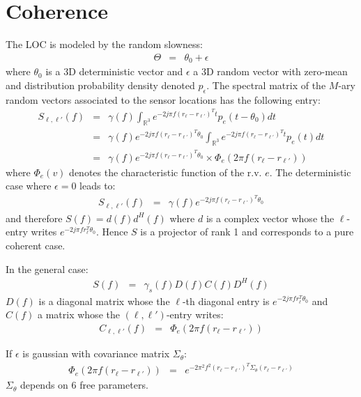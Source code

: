 \documentclass[a4paper, 12pt]{report}
\begin{document}
\chapter{Coherence}
The LOC is modeled by the random slowness:
\begin{eqnarray*}
\Theta &=& \theta_0+\epsilon
\end{eqnarray*}
where $\theta_0$ is a 3D deterministic vector and $\epsilon$ a 3D random vector with zero-mean and distribution probability density denoted $p_{\epsilon}$. The spectral matrix of the $M$-ary random vectors associated to the sensor locations has the following entry:
\begin{eqnarray*}
S_{\ell,\ell'}(f) &=& \gamma(f)\int_{\mathds{R}^3}e^{-2j\pi f (r_{\ell}-r_{\ell'})^Tt}p_{e}(t-\theta_0)dt
\\
&=&\gamma(f)
e^{-2j\pi f (r_{\ell}-r_{\ell'})^T\theta_0}
\int_{\mathds{R}^3}e^{-2j\pi f (r_{\ell}-r_{\ell'})^Tt}p_{e}(t)dt
\\
&=&\gamma(f)
e^{-2j\pi f (r_{\ell}-r_{\ell'})^T\theta_0}\times
\Phi_{e}(2\pi f(r_{\ell}-r_{\ell'}))
\end{eqnarray*}
where $\Phi_{e}(v)$ denotes the characteristic function of the r.v. $e$. The deterministic case where $\epsilon=0$ leads to:
\begin{eqnarray*}
S_{\ell,\ell'}(f) &=& \gamma(f)e^{-2j\pi f (r_{\ell}-r_{\ell'})^T\theta_0}
\end{eqnarray*}
and therefore $S(f)=d(f)d^H(f)$ where $d$ is a complex vector whose the $\ell$-entry writes $e^{-2j\pi f r_{\ell}^T\theta_0}$. Hence $S$ is a projector of rank 1 and corresponds to a pure coherent case.

In the general case:
\begin{eqnarray*}
 S(f) &=& \gamma_s(f)D(f)C(f)D^H(f)
\end{eqnarray*}
$D(f)$ is a diagonal matrix whose the $\ell$-th diagonal entry is $e^{-2j\pi f r_{\ell}^T\theta_0}$ and $C(f)$ a matrix whose the $(\ell,\ell')$-entry writes:
\begin{eqnarray*}
 C_{\ell,\ell'}(f) &=& \Phi_{e}(2\pi f(r_{\ell}-r_{\ell'}))
\end{eqnarray*}

If $\epsilon$ is gaussian with covariance matrix $\Sigma_{\theta}$:
\begin{eqnarray*}
 \Phi_{e}(2\pi f(r_{\ell}-r_{\ell'}))&=& e^{-2\pi^2f^2 (r_{\ell}-r_{\ell'})^T\Sigma_{\theta}(r_{\ell}-r_{\ell'})}
\end{eqnarray*}
$\Sigma_{\theta}$ depends on 6 free parameters. 
\end{document}
